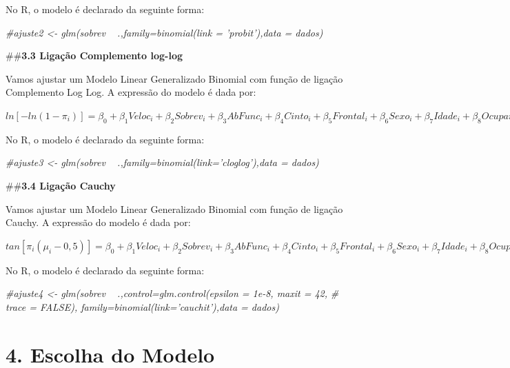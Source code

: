\documentclass[]{article}
\newenvironment{Shaded}{\begin{snugshade}}{\end{snugshade}}
\newcommand{\CommentTok}[1]{\textcolor[rgb]{0.56,0.35,0.01}{\textit{#1}}}
\begin{document}
No R, o modelo é declarado da seguinte forma:

\begin{Shaded}
\begin{Highlighting}[]
\CommentTok{#ajuste2 <- glm(sobrev ~ .,family=binomial(link = 'probit'),data = dados)}
\end{Highlighting}
\end{Shaded}

\#\#\textbf{3.3 Ligação Complemento log-log}

Vamos ajustar um Modelo Linear Generalizado Binomial com função de
ligação Complemento Log Log. A expressão do modelo é dada por:

\(ln[-ln(1-\pi_i)] = \beta_0 + \beta_1 Veloc_i + \beta_2 Sobrev_i + \beta_3 AbFunc_i + \beta_4 Cinto_i + \beta_5 Frontal_i + \beta_6 Sexo_i + \beta_7 Idade_i + \beta_8 Ocupantes_i + \beta_9 Grav_i\)

No R, o modelo é declarado da seguinte forma:

\begin{Shaded}
\begin{Highlighting}[]
\CommentTok{#ajuste3 <- glm(sobrev ~ .,family=binomial(link='cloglog'),data = dados)}
\end{Highlighting}
\end{Shaded}

\#\#\textbf{3.4 Ligação Cauchy}

Vamos ajustar um Modelo Linear Generalizado Binomial com função de
ligação Cauchy. A expressão do modelo é dada por:

\(tan[\pi_i(\mu_i- 0,5)] = \beta_0 + \beta_1 Veloc_i + \beta_2 Sobrev_i + \beta_3 AbFunc_i + \beta_4 Cinto_i + \beta_5 Frontal_i + \beta_6 Sexo_i + \beta_7 Idade_i + \beta_8 Ocupantes_i + \beta_9 Grav_i\)

No R, o modelo é declarado da seguinte forma:

\begin{Shaded}
\begin{Highlighting}[]
\CommentTok{#ajuste4 <- glm(sobrev ~ .,control=glm.control(epsilon = 1e-8, maxit = 42,}
\CommentTok{#                                           trace = FALSE), family=binomial(link='cauchit'),data = dados)}
\end{Highlighting}
\end{Shaded}

\hypertarget{escolha-do-modelo}{%
\section{4. Escolha do Modelo}\label{escolha-do-modelo}}
\end{document}
